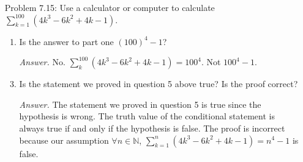 \documentclass{article}
\theoremstyle{claim}
\theoremstyle{definition}
\begin{document}
\begin{enumerate}
        \begin{enumerate}
            \item Write a contrapositive of this statement.
            \item[] \emph{Solution. } Let $\mathbb{F}$ be an ordered field. Let $x \in \mathbb{F}$ with $x \ge 0$. If $x > 0$, then $\exists \epsilon > 0$, $x > \epsilon$.
            \item Prove the statement.
            \begin{proof}
                Assume $x \in \mathbb{F}$ with $x > 0$. Since $x > 0$, $x + x > x$. So $2x > x$. And we have $2x > x > 0$. And $x > \frac{x}{2} > 0$. Let $\epsilon = \frac{x}{2}$. We see that $\epsilon > 0$ because $x > 0$. So this completes our proof. 
            \end{proof}
            \item Why do some people call this result "The Average Theorem?"
            \item[] \emph{Answer. } Looking at the contrapositive of the statement above, we see that we can always find an $\epsilon \in \mathbb{F}$ such that $\epsilon = \frac{x}{2}$ which is the average between $x$ and $0$. In the general case where $a, b \in \mathbb{F}$ and $a < b$, $\exists \epsilon \in \mathbb{F}$ so that $\epsilon = \frac{a+b}{2}$ and so $a < \epsilon < b$ where $\epsilon$ is the average of $a$ and $b$.
            \item It's easier to remember the original Average theorem though.
        \end{enumerate}
    \item[Problem 7.15:] Use a calculator or computer to calculate $\sum\limits_{k=1}^{100} (4k^3 - 6k^2 + 4k - 1)$.
        \begin{enumerate}
            \item Is the answer to part one $(100)^4 - 1$?
            \item[] \emph{Answer. }No. $\sum\limits_{k}^{100} (4k^3 - 6k^2 + 4k - 1) = 100^4$. Not $100^4 - 1$.
            \item Is the statement we proved in question 5 above true? Is the proof correct?
            \item[] \emph{Answer. }The statement we proved in question 5 is true since the hypothesis is wrong. The truth value of the conditional statement is always true if and only if the hypothesis is false. The proof is incorrect because our assumption $\forall n \in \mathbb{N}$, $\sum\limits_{k=1}^n (4k^3 - 6k^2 + 4k - 1) = n^4 - 1$ is false.
        \end{enumerate}
\end{enumerate}
\end{document}
